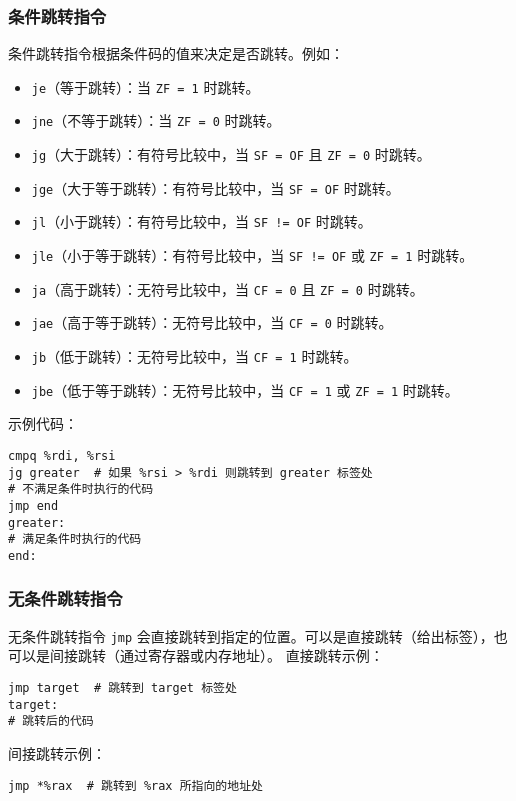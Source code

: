 \subsubsection{条件跳转指令}
条件跳转指令根据条件码的值来决定是否跳转。例如：
\begin{itemize}
    \item \texttt{je}（等于跳转）：当 \texttt{ZF = 1} 时跳转。
    \item \texttt{jne}（不等于跳转）：当 \texttt{ZF = 0} 时跳转。
    \item \texttt{jg}（大于跳转）：有符号比较中，当 \texttt{SF = OF} 且 \texttt{ZF = 0} 时跳转。
    \item \texttt{jge}（大于等于跳转）：有符号比较中，当 \texttt{SF = OF} 时跳转。
    \item \texttt{jl}（小于跳转）：有符号比较中，当 \texttt{SF != OF} 时跳转。
    \item \texttt{jle}（小于等于跳转）：有符号比较中，当 \texttt{SF != OF} 或 \texttt{ZF = 1} 时跳转。
    \item \texttt{ja}（高于跳转）：无符号比较中，当 \texttt{CF = 0} 且 \texttt{ZF = 0} 时跳转。
    \item \texttt{jae}（高于等于跳转）：无符号比较中，当 \texttt{CF = 0} 时跳转。
    \item \texttt{jb}（低于跳转）：无符号比较中，当 \texttt{CF = 1} 时跳转。
    \item \texttt{jbe}（低于等于跳转）：无符号比较中，当 \texttt{CF = 1} 或 \texttt{ZF = 1} 时跳转。
\end{itemize}
示例代码：
\begin{verbatim}
cmpq %rdi, %rsi
jg greater  # 如果 %rsi > %rdi 则跳转到 greater 标签处
# 不满足条件时执行的代码
jmp end
greater:
# 满足条件时执行的代码
end:
\end{verbatim}

\subsubsection{无条件跳转指令}
无条件跳转指令 \texttt{jmp} 会直接跳转到指定的位置。可以是直接跳转（给出标签），也可以是间接跳转（通过寄存器或内存地址）。
直接跳转示例：
\begin{verbatim}
jmp target  # 跳转到 target 标签处
target:
# 跳转后的代码
\end{verbatim}
间接跳转示例：
\begin{verbatim}
jmp *%rax  # 跳转到 %rax 所指向的地址处
\end{verbatim}

